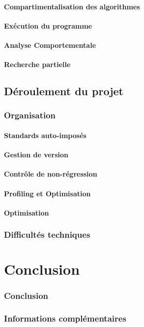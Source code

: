 \documentclass[a4paper,10pt]{report}
\begin{document}
\subsection{Compartimentalisation des algorithmes}

\subsection{Exécution du programme}

\subsection{Analyse Comportementale}

\subsection{Recherche partielle}


\chapter{Déroulement du projet}
\section{Organisation}
\subsection{Standards auto-imposés}

\subsection{Gestion de version}

\subsection{Contrôle de non-régression}

\subsection{Profiling et Optimisation}

\subsection{Optimisation}

\section{Difficultés techniques}

\part{Conclusion}
\section{Conclusion}


\section{Informations complémentaires}
\end{document}
